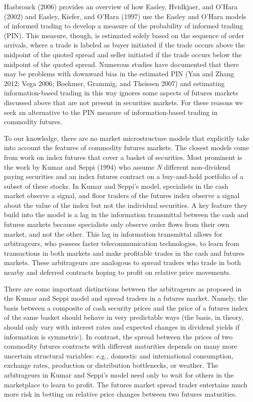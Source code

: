 \documentclass[]{elsarticle} %
\begin{document}
Hasbrouck (2006) provides an overview of how Easley, Hvidkjaer, and
O'Hara (2002) and Easley, Kiefer, and O'Hara (1997) use the Easley and
O'Hara models of informed trading to develop a measure of the
probability of informed trading (PIN). This measure, though, is
estimated solely based on the sequence of order arrivals, where a trade
is labeled as buyer initiated if the trade occurs above the midpoint of
the quoted spread and seller initiated if the trade occurs below the
midpoint of the quoted spread. Numerous studies have documented that
there may be problems with downward bias in the estimated PIN (Yan and
Zhang 2012; Vega 2006; Boehmer, Grammig, and Theissen 2007) and
estimating information-based trading in this way ignores some aspects of
futures markets discussed above that are not present in securities
markets. For these reasons we seek an alternative to the PIN measure of
information-based trading in commodity futures.

To our knowledge, there are no market microstructure models that
explicitly take into account the features of commodity futures markets.
The closest models come from work on index futures that cover a basket
of securities. Most prominent is the work by Kumar and Seppi (1994) who
assume \emph{N} different non-dividend paying securities and an index
futures contract on a buy-and-hold portfolio of a subset of these
stocks. In Kumar and Seppi's model, specialists in the cash market
observe a signal, and floor traders of the futures index observe a
signal about the value of the index but not the individual securities. A
key feature they build into the model is a lag in the information
transmittal between the cash and futures markets because specialists
only observe order flows from their own market, and not the other. This
lag in information transmittal allows for arbitrageurs, who possess
faster telecommunication technologies, to learn from transactions in
both markets and make profitable trades in the cash and futures markets.
These arbitrageurs are analogous to spread traders who trade in both
nearby and deferred contracts hoping to profit on relative price
movements.

There are some important distinctions between the arbitrageurs as
proposed in the Kumar and Seppi model and spread traders in a futures
market. Namely, the basis between a composite of cash security prices
and the price of a futures index of the same basket should behave in
very predictable ways (the basis, in theory, should only vary with
interest rates and expected changes in dividend yields if information is
symmetric). In contrast, the spread between the prices of two commodity
futures contracts with different maturities depends on many more
uncertain structural variables: e.g., domestic and international
consumption, exchange rates, production or distribution bottlenecks, or
weather. The arbitrageurs in Kumar and Seppi's model need only to wait
for others in the marketplace to learn to profit. The futures market
spread trader entertains much more risk in betting on relative price
changes between two futures maturities.
\end{document}
